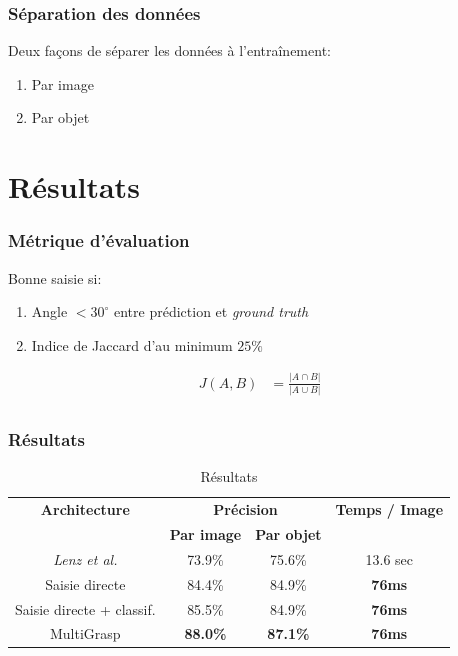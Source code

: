 \documentclass{beamer}
\begin{document}
\begin{frame}
  \frametitle{Séparation des données}
  Deux façons de séparer les données à l'entraînement:
  \begin{enumerate}
  \item Par image
  \item Par objet
  \end{enumerate}
\end{frame}

\section{Résultats}
\begin{frame}
  \frametitle{Métrique d'évaluation}
  Bonne saisie si:
  \begin{enumerate}
  \item Angle $< 30^{\circ}$ entre prédiction et \emph{ground truth}
  \item Indice de Jaccard d'au minimum $25\%$
  \end{enumerate}
  \begin{align*}
    \label{eq:jaccard}
    J(A,B) &= \frac{|A \cap B|}{|A \cup B|}\\
  \end{align*}
\end{frame}

\begin{frame}
  \frametitle{Résultats}
  \begin{table}
    \centering
    \begin{tabular}{|c|c|c|c|}
      \hline
      \textbf{Architecture}&\multicolumn{2}{|c|}{\textbf{Précision}} &\textbf{Temps / Image}\\
                           &\textbf{Par image}&\textbf{Par objet}&\\
      \hline
      \hline
      \emph{Lenz et al.} & 73.9\% & 75.6\% & 13.6 sec\\
      \hline
      Saisie directe & 84.4\% & 84.9\% & \textbf{76ms}\\
      \hline
      Saisie directe + classif. & 85.5\% & 84.9\% & \textbf{76ms}\\
      \hline
      MultiGrasp & \textbf{88.0\%} & \textbf{87.1\%} & \textbf{76ms}\\
      \hline
    \end{tabular}
    \caption{Résultats}
    \label{tab:results}
  \end{table}
\end{frame}
\end{document}
